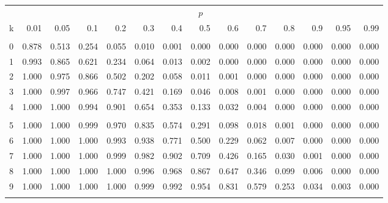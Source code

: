\documentclass[
]{article}
\begin{document}
\begin{longtable}[t]{lrrrrrrrrrrrrr}
\toprule
\multicolumn{1}{c}{ } & \multicolumn{13}{c}{$p$} \\
\cmidrule(l{3pt}r{3pt}){2-14}
k & 0.01 & 0.05 & 0.1 & 0.2 & 0.3 & 0.4 & 0.5 & 0.6 & 0.7 & 0.8 & 0.9 & 0.95 & 0.99\\
\midrule
\addlinespace[0.3em]
\multicolumn{14}{l}{$n=13$}\\
\hspace{1em}0 & 0.878 & 0.513 & 0.254 & 0.055 & 0.010 & 0.001 & 0.000 & 0.000 & 0.000 & 0.000 & 0.000 & 0.000 & 0.000\\
\hspace{1em}1 & 0.993 & 0.865 & 0.621 & 0.234 & 0.064 & 0.013 & 0.002 & 0.000 & 0.000 & 0.000 & 0.000 & 0.000 & 0.000\\
\hspace{1em}2 & 1.000 & 0.975 & 0.866 & 0.502 & 0.202 & 0.058 & 0.011 & 0.001 & 0.000 & 0.000 & 0.000 & 0.000 & 0.000\\
\hspace{1em}3 & 1.000 & 0.997 & 0.966 & 0.747 & 0.421 & 0.169 & 0.046 & 0.008 & 0.001 & 0.000 & 0.000 & 0.000 & 0.000\\
\hspace{1em}4 & 1.000 & 1.000 & 0.994 & 0.901 & 0.654 & 0.353 & 0.133 & 0.032 & 0.004 & 0.000 & 0.000 & 0.000 & 0.000\\
\addlinespace[-.7em]
\multicolumn{14}{l}{ }\\
\hspace{1em}5 & 1.000 & 1.000 & 0.999 & 0.970 & 0.835 & 0.574 & 0.291 & 0.098 & 0.018 & 0.001 & 0.000 & 0.000 & 0.000\\
\hspace{1em}6 & 1.000 & 1.000 & 1.000 & 0.993 & 0.938 & 0.771 & 0.500 & 0.229 & 0.062 & 0.007 & 0.000 & 0.000 & 0.000\\
\hspace{1em}7 & 1.000 & 1.000 & 1.000 & 0.999 & 0.982 & 0.902 & 0.709 & 0.426 & 0.165 & 0.030 & 0.001 & 0.000 & 0.000\\
\hspace{1em}8 & 1.000 & 1.000 & 1.000 & 1.000 & 0.996 & 0.968 & 0.867 & 0.647 & 0.346 & 0.099 & 0.006 & 0.000 & 0.000\\
\hspace{1em}9 & 1.000 & 1.000 & 1.000 & 1.000 & 0.999 & 0.992 & 0.954 & 0.831 & 0.579 & 0.253 & 0.034 & 0.003 & 0.000\\
\addlinespace[-.7em]
\multicolumn{14}{l}{ }\\

\end{longtable}
\end{document}
